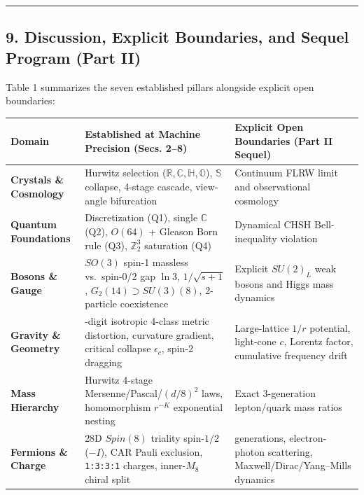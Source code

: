 \documentclass[
  a4paper,
]{article}
\newcounter{none} %
\begin{document}
\begin{center}\rule{0.5\linewidth}{0.5pt}\end{center}

\subsection{9. Discussion, Explicit Boundaries, and Sequel Program (Part
II)}\label{discussion-explicit-boundaries-and-sequel-program-part-ii}

Table 1 summarizes the seven established pillars alongside explicit open
boundaries:

{\def\LTcaptype{none} %
\begin{longtable}[]{@{}
  >{\raggedright\arraybackslash}p{}
  >{\raggedright\arraybackslash}p{}
  >{\raggedright\arraybackslash}p{}@{}}
\toprule\noalign{}
\begin{minipage}[b]{\linewidth}\raggedright
Domain
\end{minipage} & \begin{minipage}[b]{\linewidth}\raggedright
Established at Machine Precision (Secs. 2--8)
\end{minipage} & \begin{minipage}[b]{\linewidth}\raggedright
Explicit Open Boundaries (Part II Sequel)
\end{minipage} \\
\midrule\noalign{}
\endhead
\bottomrule\noalign{}
\endlastfoot
\textbf{Crystals \& Cosmology} & Hurwitz selection
(\(\mathbb{R},\mathbb{C},\mathbb{H},\mathbb{O}\)), \(\mathbb{S}\)
collapse, 4-stage cascade, view-angle bifurcation & Continuum FLRW limit
and observational cosmology \\
\textbf{Quantum Foundations} & Discretization (Q1), single
\(\mathbb{C}\) (Q2), \(O(64)\) + Gleason Born rule (Q3),
\(\mathbb{Z}_2^3\) saturation (Q4) & Dynamical CHSH Bell-inequality
violation \\
\textbf{Bosons \& Gauge} & \(SO(3)\) spin-1 massless vs.~spin-0/2 gap
\(\ln 3\), \(1/\sqrt{s+1}\), \(G_2(14)\supset SU(3)(8)\), 2-particle
coexistence & Explicit \(SU(2)_L\) weak bosons and Higgs mass
dynamics \\
\textbf{Gravity \& Geometry} & 7-digit isotropic 4-class metric
distortion, curvature gradient, critical collapse \(\epsilon_c\), spin-2
dragging & Large-lattice \(1/r\) potential, light-cone \(c\), Lorentz
factor, cumulative frequency drift \\
\textbf{Mass Hierarchy} & Hurwitz 4-stage Mersenne/Pascal/\((d/8)^2\)
laws, homomorphism \(r^{-K}\) exponential nesting & Exact 3-generation
lepton/quark mass ratios \\
\textbf{Fermions \& Charge} & 28D \(Spin(8)\) triality spin-\(1/2\)
(\(-I\)), CAR Pauli exclusion, \texttt{1:3:3:1} charges, inner-\(M_8\)
chiral split & 3 generations, electron-photon scattering,
Maxwell/Dirac/Yang--Mills dynamics \\
\end{longtable}
}
\end{document}
